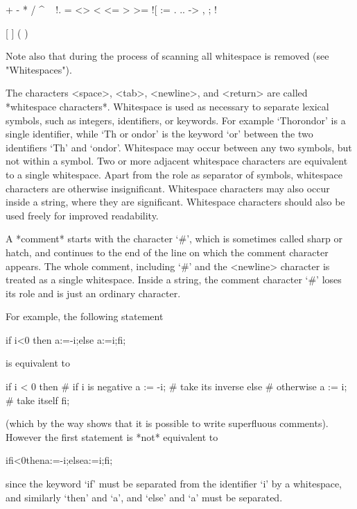 \begintt
+    -    *    /    ^    ~   !.
=    <>   <    <=   >    >=  ![
:=   .    ..   ->   ,    ;   !{
[    ]    {    }    (    )    
\endtt

Note also that during the process of scanning all whitespace is removed
(see "Whitespaces").


The  characters <space>, <tab>,  <newline>, and  <return> are called
*whitespace characters*.  Whitespace is used  as necessary to separate
lexical symbols, such as integers, identifiers, or keywords. For example
`Thorondor' is a single identifier, while `Th or ondor' is the keyword
`or' between the two identifiers `Th' and `ondor'. Whitespace may occur
between any two symbols, but not within a symbol. Two or more adjacent
whitespace characters are equivalent to a single whitespace.
Apart from the role as separator of symbols,
whitespace characters are  otherwise insignificant.
Whitespace characters may also occur inside a string,
where they are significant.
Whitespace characters should also be used freely for improved readability.

A *comment* starts with the  character `\#', which is sometimes called
sharp or hatch, and continues to the end of the line on which the comment
character appears. The whole comment, including `\#' and the <newline>
character is treated as a single  whitespace. Inside a string, the
comment character `\#' loses its role and is just an ordinary character.

For example, the following statement

\begintt
if i<0 then a:=-i;else a:=i;fi;
\endtt

is equivalent to

\begintt
if i < 0 then   # if i is negative
  a := -i;      #   take its inverse
else            # otherwise
  a := i;       #   take itself
fi;
\endtt

(which by the way shows that it is possible to write superfluous
comments). However the first statement is *not* equivalent to

\begintt
ifi<0thena:=-i;elsea:=i;fi;
\endtt

since the keyword `if' must be separated from the identifier `i' by a
whitespace, and similarly `then' and `a', and `else' and `a' must be
separated.


}
